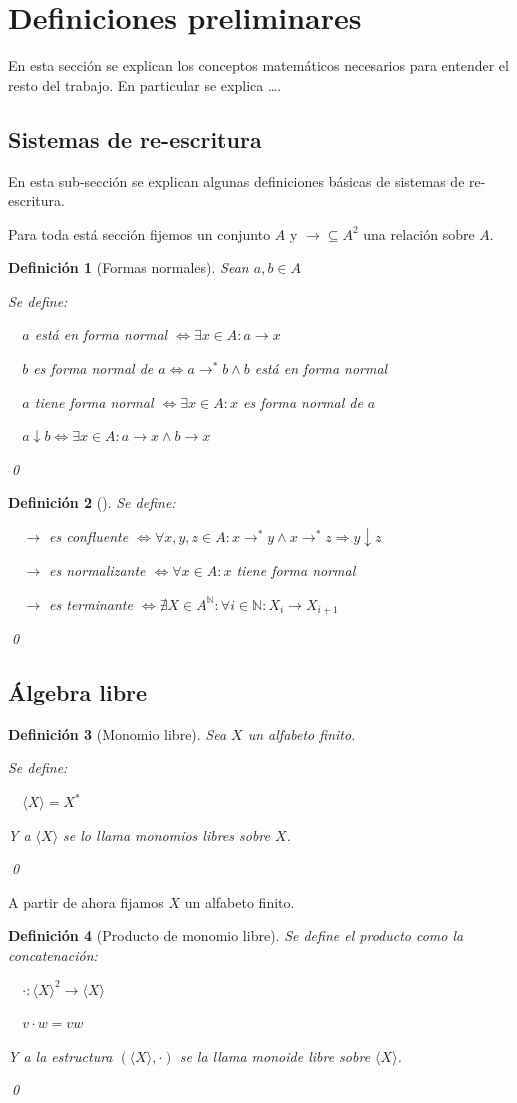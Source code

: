 \documentclass{amsbook}
\theoremstyle{customstyle}
\newtheorem{definition}{Definición}[section]
\newcommand{\definición}[2][]{
  \begin{definition}[#1]
  \setlength{\parindent}{2em} %
  #2
  \qed
  \end{definition}
}
\begin{document}
\fontsize{16pt}{19pt}\selectfont %


\section{Definiciones preliminares}

En esta sección se explican los conceptos matemáticos necesarios para entender el resto del trabajo.
En particular se explica …. %

\subsection{Sistemas de re-escritura}

En esta sub-sección se explican algunas definiciones básicas de sistemas de re-escritura.

Para toda está sección fijemos un conjunto $A$ y $→ ⊆ A^2$ una relación sobre $A$.

\definición[Formas normales] {
Sean $a, b ∈ A$

Se define:

  $a$ está en forma normal $⇔ ∃x ∈ A : a → x$

  $b$ es forma normal de $a ⇔ a →^* b ∧ b$ está en forma normal

  $a$ tiene forma normal $⇔ ∃x ∈ A : x$ es forma normal de $a$

  $a ↓ b ⇔ ∃x ∈ A : a → x ∧ b → x$
}

\definición[] {


Se define:

  $→$ es confluente $⇔ ∀x, y, z ∈ A : x →^* y ∧ x →^*z ⇒ y ↓ z$

  $→$ es normalizante $⇔ ∀x ∈ A : x$ tiene forma normal

  $→$ es terminante $⇔ ∄X ∈ A^ℕ : ∀i ∈ ℕ : X_i → X_{i + 1}$
}


\subsection{Álgebra libre}

\definición[Monomio libre] {
Sea $X$ un alfabeto finito.

Se define:

  $⟨X⟩ = X^*$

Y a $⟨X⟩$ se lo llama monomios libres sobre $X$.
}

A partir de ahora fijamos $X$ un alfabeto finito.

\definición[Producto de monomio libre] {
Se define el producto como la concatenación:

  $· : ⟨X⟩^2 → ⟨X⟩$

  $v · w = vw$

Y a la estructura $(⟨X⟩, ·)$ se la llama monoide libre sobre $⟨X⟩$.
}
\end{document}

